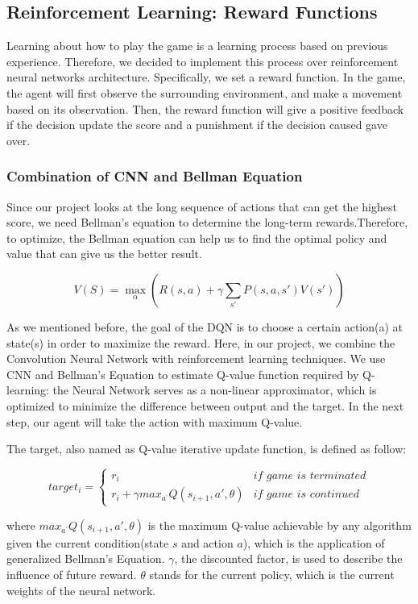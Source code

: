 \documentclass{article}
\begin{document}
\subsection{Reinforcement Learning: Reward Functions}
Learning about how to play the game is a learning process based on previous experience. Therefore, we decided to implement this process over reinforcement neural networks architecture. Specifically, we set a reward function. In the game, the agent will first observe the surrounding environment, and make a movement based on its observation. Then, the reward function will give a positive feedback if the decision update the score and a punishment if the decision caused gave over. 

\subsubsection{Combination of CNN and Bellman Equation}
Since our project looks at the long sequence of actions that can get the highest score, we need Bellman's equation to determine the long-term rewards.Therefore, to optimize, the Bellman equation can help us to find the optimal policy and value that can give us the better result.

$$V(S) = \max_{\alpha}(R(s, a) + \gamma\sum_{s'} P(s,a,s')V(s'))$$

As we mentioned before, the goal of the DQN is to choose a certain action(a) at state(s) in order to maximize the reward. Here, in our project, we combine the Convolution Neural Network with reinforcement learning techniques. We use CNN and Bellman’s Equation to estimate Q-value function required by Q-learning: the Neural Network serves as a non-linear approximator, which is optimized to minimize the difference between output and the target. In the next step, our agent will take the action with maximum Q-value.

The target, also named as Q-value iterative update function, is defined as follow:

\begin{equation}
    target_i = 
    \begin{cases}
    r_i & \textit{if game is terminated}\\
    r_i + \gamma max_{a^{'}}Q(s_{i + 1}, a', \theta) & \textit{if game is continued}
    \end{cases}
\end{equation}

where $max_{a^{'}}Q(s_{i + 1}, a', \theta)$ is the maximum Q-value achievable by any algorithm given the current condition(state $s$ and action $a$), which is the application of generalized Bellman’s Equation. $\gamma$, the discounted factor, is used to describe the influence of future reward. $\theta$ stands for the current policy, which is the current weights of the neural network.
\end{document}
